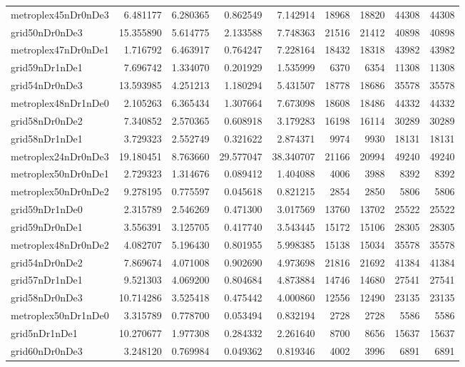 \begin{longtable}{|l|r|r|r|r|r|r|r|r|}
metroplex45nDr0nDe3 & 6.481177 & 6.280365 & 0.862549 & 7.142914 & 18968 & 18820 & 44308 & 44308 \\
grid50nDr0nDe3 & 15.355890 & 5.614775 & 2.133588 & 7.748363 & 21516 & 21412 & 40898 & 40898 \\
metroplex47nDr0nDe1 & 1.716792 & 6.463917 & 0.764247 & 7.228164 & 18432 & 18318 & 43982 & 43982 \\
grid59nDr1nDe1 & 7.696742 & 1.334070 & 0.201929 & 1.535999 & 6370 & 6354 & 11308 & 11308 \\
grid54nDr0nDe3 & 13.593985 & 4.251213 & 1.180294 & 5.431507 & 18778 & 18686 & 35578 & 35578 \\
metroplex48nDr1nDe0 & 2.105263 & 6.365434 & 1.307664 & 7.673098 & 18608 & 18486 & 44332 & 44332 \\
grid58nDr0nDe2 & 7.340852 & 2.570365 & 0.608918 & 3.179283 & 16198 & 16114 & 30289 & 30289 \\
grid58nDr1nDe1 & 3.729323 & 2.552749 & 0.321622 & 2.874371 & 9974 & 9930 & 18131 & 18131 \\
metroplex24nDr0nDe3 & 19.180451 & 8.763660 & 29.577047 & 38.340707 & 21166 & 20994 & 49240 & 49240 \\
metroplex50nDr0nDe1 & 2.729323 & 1.314676 & 0.089412 & 1.404088 & 4006 & 3988 & 8392 & 8392 \\
metroplex50nDr0nDe2 & 9.278195 & 0.775597 & 0.045618 & 0.821215 & 2854 & 2850 & 5806 & 5806 \\
grid59nDr1nDe0 & 2.315789 & 2.546269 & 0.471300 & 3.017569 & 13760 & 13702 & 25522 & 25522 \\
grid59nDr0nDe1 & 3.556391 & 3.125705 & 0.417740 & 3.543445 & 15172 & 15106 & 28305 & 28305 \\
metroplex48nDr0nDe2 & 4.082707 & 5.196430 & 0.801955 & 5.998385 & 15138 & 15034 & 35578 & 35578 \\
grid54nDr0nDe2 & 7.869674 & 4.071008 & 0.902690 & 4.973698 & 21816 & 21692 & 41384 & 41384 \\
grid57nDr1nDe1 & 9.521303 & 4.069200 & 0.804684 & 4.873884 & 14746 & 14680 & 27541 & 27541 \\
grid58nDr0nDe3 & 10.714286 & 3.525418 & 0.475442 & 4.000860 & 12556 & 12490 & 23135 & 23135 \\
metroplex50nDr1nDe0 & 3.315789 & 0.778700 & 0.053494 & 0.832194 & 2728 & 2728 & 5586 & 5586 \\
grid5nDr1nDe1 & 10.270677 & 1.977308 & 0.284332 & 2.261640 & 8700 & 8656 & 15637 & 15637 \\
grid60nDr0nDe3 & 3.248120 & 0.769984 & 0.049362 & 0.819346 & 4002 & 3996 & 6891 & 6891 \\

\end{longtable}
